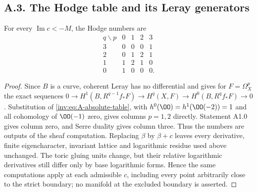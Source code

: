 \subsection{A.3. The Hodge table and its Leray generators}

\begin{proposition}\label{inv:A3.1}
For every $\operatorname{Im}c<-M$, the Hodge numbers are
\[
\begin{array}{c|rrrr}
q\backslash p&0&1&2&3\\\hline
3&0&0&0&1\\
2&0&1&2&1\\
1&1&2&1&0\\
0&1&0&0&0.
\end{array}
\]
\end{proposition}
\begin{proof}
Since $B$ is a curve, coherent Leray has no differential and gives
for $F=\Omega_X^p$ the exact sequences
$0\to H^1(B,R^{q-1}f_*F)\to H^q(X,F)\to H^0(B,R^qf_*F)\to0$.
Substitution of \eqref{inv:eq:A-absolute-table}, with
$h^0(\OO)=h^1(\OO(-2))=1$ and all cohomology of $\OO(-1)$ zero,
gives columns $p=1,2$ directly.  Statement A1.0 gives column zero,
and Serre duality gives column three.  Thus the numbers are outputs
of the sheaf computation.  Replacing $\beta$ by $\beta+c$ leaves
every derivative, finite eigencharacter, invariant lattice and
logarithmic residue used above unchanged.  The toric gluing units
change, but their relative logarithmic derivatives still differ only
by base logarithmic forms.  Hence the same computations apply at
each admissible $c$, including every point arbitrarily close to the
strict boundary; no manifold at the excluded boundary is asserted.
\end{proof}

